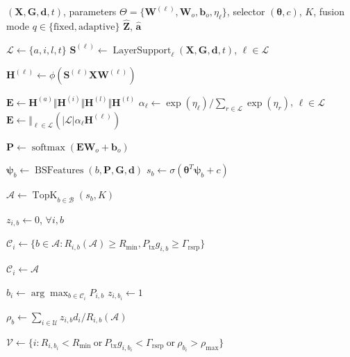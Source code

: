 \documentclass[journal]{IEEEtran}
\begin{document}
\begin{algorithm}[!t]
\caption{Multilayer GNN Association With Active-BS Repair}
\label{alg:method}
\begin{algorithmic}[1]
\Require $(\mathbf{X},\mathbf{G},\mathbf{d},t)$, parameters
$\Theta=\{\mathbf{W}^{(\ell)},\mathbf{W}_o,\mathbf{b}_o,\eta_{\ell}\}$,
selector $(\boldsymbol{\theta},c)$, $K$, fusion mode
$q\in\{\mathrm{fixed},\mathrm{adaptive}\}$
\Ensure $\widehat{\mathbf{Z}}$, $\widehat{\mathbf{a}}$

\State $\mathcal{L}\gets\{a,i,l,t\}$
\State $\mathbf{S}^{(\ell)}\gets\operatorname{LayerSupport}_{\ell}
(\mathbf{X},\mathbf{G},\mathbf{d},t)$, $\ell\in\mathcal{L}$

    \State $\mathbf{H}^{(\ell)}
    \gets \phi(\mathbf{S}^{(\ell)}\mathbf{X}\mathbf{W}^{(\ell)})$
\EndFor

    \State $\mathbf{E}\gets
    \mathbf{H}^{(a)}\Vert \mathbf{H}^{(i)}
    \Vert \mathbf{H}^{(l)}\Vert \mathbf{H}^{(t)}$
\Else
    \State $\alpha_{\ell}\gets
    \exp(\eta_{\ell})/\sum_{r\in\mathcal{L}}\exp(\eta_r)$,
    $\ell\in\mathcal{L}$
    \State $\mathbf{E}\gets
    \Vert_{\ell\in\mathcal{L}}\left(|\mathcal{L}|\alpha_{\ell}
    \mathbf{H}^{(\ell)}\right)$
\EndIf

\State $\mathbf{P}\gets
\operatorname{softmax}(\mathbf{E}\mathbf{W}_o+\mathbf{b}_o)$

    \State $\boldsymbol{\psi}_b\gets\operatorname{BSFeatures}(b,\mathbf{P},
    \mathbf{G},\mathbf{d})$
    \State $s_b\gets\sigma(\boldsymbol{\theta}^{T}\boldsymbol{\psi}_b+c)$
\EndFor

\State $\mathcal{A}\gets\operatorname{TopK}_{b\in\mathcal{B}}(s_b,K)$

\Repeat
    \State $z_{i,b}\gets0$, $\forall i,b$

        \State $\mathcal{C}_i\gets
        \{b\in\mathcal{A}:R_{i,b}(\mathcal{A})\geq R_{\min},
        P_{\mathrm{tx}}g_{i,b}\geq\Gamma_{\mathrm{rsrp}}\}$

            \State $\mathcal{C}_i\gets\mathcal{A}$
        \EndIf

        \State $b_i\gets\arg\max_{b\in\mathcal{C}_i}P_{i,b}$
        \State $z_{i,b_i}\gets1$
    \EndFor

    \State $\rho_b\gets
    \sum_{i\in\mathcal{U}}z_{i,b}d_i/R_{i,b}(\mathcal{A})$

    \State $\mathcal{V}\gets
    \{i:R_{i,b_i}<R_{\min}\ \text{or}\
    P_{\mathrm{tx}}g_{i,b_i}<\Gamma_{\mathrm{rsrp}}\ \text{or}\
    \rho_{b_i}>\rho_{\max}\}$


\end{algorithmic}
\end{algorithm}
\end{document}
